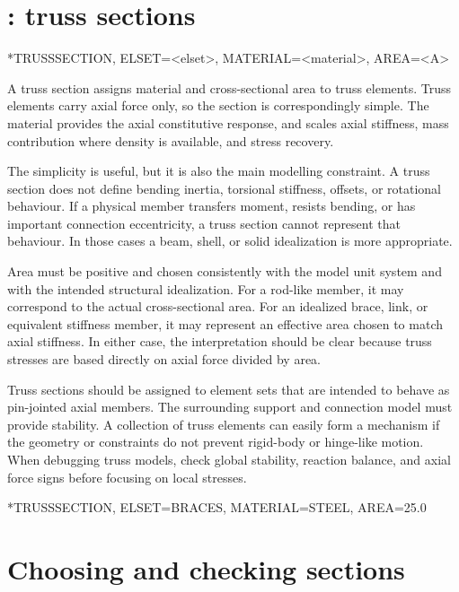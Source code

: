 \clearpage

\section{: truss sections}

\begin{syntax}
*TRUSSSECTION, ELSET=<elset>, MATERIAL=<material>, AREA=<A>
\end{syntax}

A truss section assigns material and cross-sectional area to truss elements. Truss elements carry axial force only, so the section is correspondingly simple. The material provides the axial constitutive response, and  scales axial stiffness, mass contribution where density is available, and stress recovery.

The simplicity is useful, but it is also the main modelling constraint. A truss section does not define bending inertia, torsional stiffness, offsets, or rotational behaviour. If a physical member transfers moment, resists bending, or has important connection eccentricity, a truss section cannot represent that behaviour. In those cases a beam, shell, or solid idealization is more appropriate.

Area must be positive and chosen consistently with the model unit system and with the intended structural idealization. For a rod-like member, it may correspond to the actual cross-sectional area. For an idealized brace, link, or equivalent stiffness member, it may represent an effective area chosen to match axial stiffness. In either case, the interpretation should be clear because truss stresses are based directly on axial force divided by area.

Truss sections should be assigned to element sets that are intended to behave as pin-jointed axial members. The surrounding support and connection model must provide stability. A collection of truss elements can easily form a mechanism if the geometry or constraints do not prevent rigid-body or hinge-like motion. When debugging truss models, check global stability, reaction balance, and axial force signs before focusing on local stresses.

\begin{exampledeck}
*TRUSSSECTION, ELSET=BRACES, MATERIAL=STEEL, AREA=25.0
\end{exampledeck}

\clearpage

\section{Choosing and checking sections}

